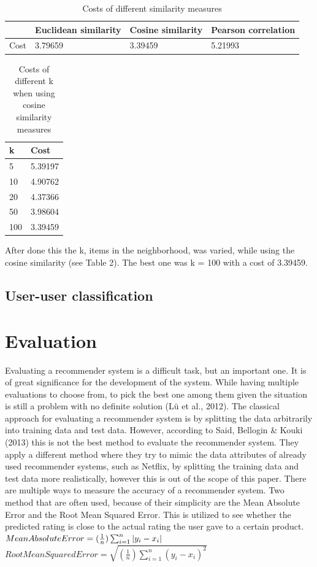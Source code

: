 \documentclass[11pt]{article}
\begin{document}
\newpage

\begin{table}[]
\begin{tabular}{@{}|l|l|l|l|@{}}
\toprule
     & Euclidean similarity & Cosine similarity & Pearson correlation \\ \midrule
Cost & 3.79659              & 3.39459           & 5.21993             \\ \bottomrule
\end{tabular}
\caption{Costs of different similarity measures}
\end{table}


\begin{table}[]
\begin{tabular}{@{}ll@{}}
\toprule
k   & Cost    \\ \midrule
5   & 5.39197 \\
10  & 4.90762 \\
20  & 4.37366 \\
50  & 3.98604 \\
100 & 3.39459 \\ \bottomrule
\end{tabular}
\caption{Costs of different k when using cosine similarity measures}
\end{table}

After done this the k, items in the neighborhood, was varied, while using the cosine similarity (see Table 2). The best one was k = 100 with a cost of 3.39459.

\subsection{User-user classification}
\section{Evaluation}

Evaluating a recommender system is a difficult task, but an important one. It is of great significance for the development of the system. While having multiple evaluations to choose from, to pick the best one among them given the situation is still a problem with no definite solution (Lü et al., 2012).  The classical approach for evaluating a recommender system is by splitting the data arbitrarily into training data and test data. However, according to Said, Bellogin & Kouki (2013) this is not the best method to evaluate the recommender system. They apply a different method where they try to mimic the data attributes of already used recommender systems, such as Netflix, by splitting the training data and test data more realistically, however this is out of the scope of this paper. There are multiple ways to measure the accuracy of a recommender system. Two method that are often used, because of their simplicity are the Mean Absolute Error and the Root Mean Squared Error. This is utilized to see whether the predicted rating is close to the actual rating the user gave to a certain product. \\
\m
$Mean Absolute Error =  (\frac{1}{n})\sum_{i=1}^{n}\left | y_{i} - x_{i} \right |\\
$$Root Mean Squared Error = \sqrt{(\frac{1}{n})\sum_{i=1}^{n}(y_{i} - x_{i})^{2}} $
\end{document}
